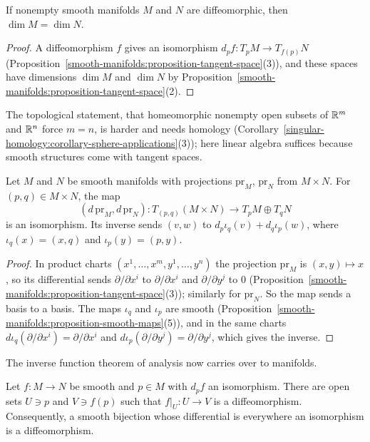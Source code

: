 \begin{corollary}\label{smooth-manifolds:corollary-invariance-dimension}
If nonempty smooth manifolds $M$ and $N$ are diffeomorphic, then $\dim M = \dim N$.
\end{corollary}

\begin{proof}
A diffeomorphism $f$ gives an isomorphism $d_pf \colon T_pM \to T_{f(p)}N$ (Proposition~\ref{smooth-manifolds:proposition-tangent-space}(3)), and these spaces
have dimensions $\dim M$ and $\dim N$ by Proposition~\ref{smooth-manifolds:proposition-tangent-space}(2).
\end{proof}

The topological statement, that homeomorphic nonempty open subsets of $\mathbb{R}^m$ and $\mathbb{R}^n$ force $m = n$, is harder and needs homology
(Corollary~\ref{singular-homology:corollary-sphere-applications}(3)); here linear algebra suffices because smooth structures come with tangent spaces.

\begin{proposition}\label{smooth-manifolds:proposition-product-tangent}
Let $M$ and $N$ be smooth manifolds with projections $\mathrm{pr}_M$, $\mathrm{pr}_N$ from $M \times N$. For $(p, q) \in M \times N$, the map
\[
(d\,\mathrm{pr}_M, d\,\mathrm{pr}_N) \colon T_{(p,q)}(M \times N) \to T_pM \oplus T_qN
\]
is an isomorphism. Its inverse sends $(v, w)$ to $d_p\iota_q(v) + d_q\iota_p(w)$, where $\iota_q(x) = (x, q)$ and $\iota_p(y) = (p, y)$.
\end{proposition}

\begin{proof}
In product charts $(x^1, \ldots, x^m, y^1, \ldots, y^n)$ the projection $\mathrm{pr}_M$ is $(x, y) \mapsto x$, so its differential sends
$\partial/\partial x^i$ to $\partial/\partial x^i$ and $\partial/\partial y^j$ to $0$ (Proposition~\ref{smooth-manifolds:proposition-tangent-space}(3)); similarly
for $\mathrm{pr}_N$. So the map sends a basis to a basis. The maps $\iota_q$ and $\iota_p$ are smooth (Proposition~\ref{smooth-manifolds:proposition-smooth-maps}(5)),
and in the same charts $d\iota_q(\partial/\partial x^i) = \partial/\partial x^i$ and $d\iota_p(\partial/\partial y^j) = \partial/\partial y^j$, which gives the
inverse.
\end{proof}

The inverse function theorem of analysis now carries over to manifolds.

\begin{theorem}\label{smooth-manifolds:theorem-inverse-function-manifolds}
Let $f \colon M \to N$ be smooth and $p \in M$ with $d_pf$ an isomorphism. There are open sets $U \ni p$ and $V \ni f(p)$ such that $f|_U \colon U \to V$ is a
diffeomorphism. Consequently, a smooth bijection whose differential is everywhere an isomorphism is a diffeomorphism.
\end{theorem}

